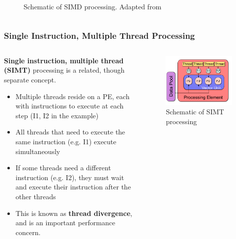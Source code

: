 \documentclass{beamer}
\newcounter{dummynote1}%
\newcounter{dummynote2}%
\begin{document}
\begin{frame}
\begin{columns}
\begin{column}{0.4\textwidth}
\begin{figure}
    \caption{Schematic of SIMD processing.  Adapted from\footnotemark[\value{dummynote1}]}
  \end{figure}
 \end{column}
 \end{columns}
 \setcounter{footnote}{\value{dummynote1}}
\end{frame}

\begin{frame}
 \frametitle{Single Instruction, Multiple Thread Processing}
 \begin{columns}
 \begin{column}{0.6\textwidth}
 \textbf{Single instruction, multiple thread (SIMT)} processing is a related, though separate concept.
 \begin{itemize}
  \item Multiple threads reside on a PE, each with instructions to execute at each step (\textrm{I1}, \textrm{I2} in the example)
  \item All threads that need to execute the same instruction (e.g. \textrm{I1}) execute simultaneously
  \item If some threads need a different instruction (e.g. \textrm{I2}), they must wait and execute their instruction after the other threads
  \item This is known as \textbf{thread divergence}, and is an important performance concern.
 \end{itemize}
 \end{column}
 \begin{column}{0.4\textwidth}
  \begin{figure}[r]
    \centering
    \includegraphics[width=\columnwidth]{SIMT.pdf}
    \caption{Schematic of SIMT processing}
  \end{figure}
 \end{column}
 \end{columns}
\end{frame}
\end{document}
